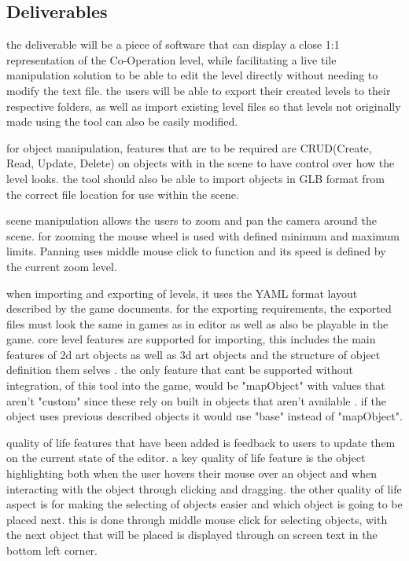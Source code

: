 \subsection{Deliverables}
the deliverable will be a piece of software that can display a close 1:1 representation of the Co-Operation level, while facilitating a live tile manipulation solution to be able to edit the level directly without needing to modify the text file. the users will be able to export their created levels to their respective folders, as well as import existing level files so that levels not originally made using the tool can also be easily modified.

for object manipulation, features that are to be required are CRUD(Create, Read, Update, Delete) on objects with in the scene to have control over how the level looks. the tool should also be able to import objects in GLB format from the correct file location for use within the scene.

scene manipulation allows the users to zoom and pan the camera around the scene. for zooming the mouse wheel is used with defined minimum and maximum limits. Panning uses middle mouse click to function and its speed is defined by the current zoom level.  

when importing and exporting of levels, it uses the YAML format layout described by the game documents. for the exporting requirements, the exported files must look the same in games as in editor as well as also be playable in the game. core level features are supported for importing, this includes the main features of 2d art objects  as well as 3d art objects  and the structure of object definition them selves . the only feature that cant be supported without integration, of this tool into the game, would be "mapObject" with values that aren't "custom" since these rely on built in objects that aren't available . if the object uses previous described objects it would use "base" instead of "mapObject". 

quality of life features that have been added is feedback to users to update them on the current state of the editor. a key quality of life feature is the object highlighting both when the user hovers their mouse over an object and when interacting with the object through clicking and dragging. the other quality of life aspect is for making the selecting of objects easier and which object is going to be placed next.  this is done through middle mouse click for selecting objects, with the next object that will be placed is displayed through on screen text in the bottom left corner.

